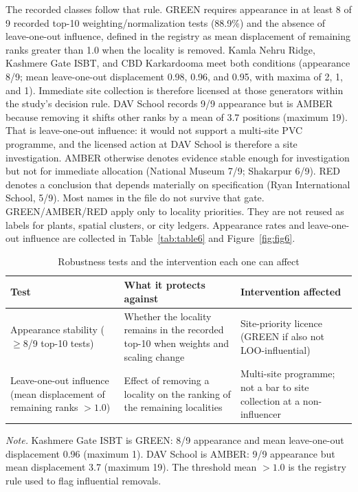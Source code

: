 \documentclass[12pt,a4paper]{article}
\begin{document}
The recorded classes follow that rule. GREEN requires appearance in at least 8 of 9 recorded top-10 weighting/normalization tests (88.9\%) and the absence of leave-one-out influence, defined in the registry as mean displacement of remaining ranks greater than 1.0 when the locality is removed. Kamla Nehru Ridge, Kashmere Gate ISBT, and CBD Karkardooma meet both conditions (appearance 8/9; mean leave-one-out displacement 0.98, 0.96, and 0.95, with maxima of 2, 1, and 1). Immediate site collection is therefore licensed at those generators within the study's decision rule. DAV School records 9/9 appearance but is AMBER because removing it shifts other ranks by a mean of 3.7 positions (maximum 19). That is leave-one-out influence: it would not support a multi-site PVC programme, and the licensed action at DAV School is therefore a site investigation. AMBER otherwise denotes evidence stable enough for investigation but not for immediate allocation (National Museum 7/9; Shakarpur 6/9). RED denotes a conclusion that depends materially on specification (Ryan International School, 5/9). Most names in the file do not survive that gate. GREEN/AMBER/RED apply only to locality priorities. They are not reused as labels for plants, spatial clusters, or city ledgers. Appearance rates and leave-one-out influence are collected in Table~\ref{tab:table6} and Figure~\ref{fig:fig6}.

\begin{table}[htbp]
\centering
\caption{Robustness tests and the intervention each one can affect}
\label{tab:robusttests}
\begin{tabular}{L{3.4cm}L{5.4cm}L{5.0cm}}
\toprule
\textbf{Test} & \textbf{What it protects against} & \textbf{Intervention affected} \\
\midrule
Appearance stability ($\geq$8/9 top-10 tests) & Whether the locality remains in the recorded top-10 when weights and scaling change & Site-priority licence (GREEN if also not LOO-influential) \\
Leave-one-out influence (mean displacement of remaining ranks $>1.0$) & Effect of removing a locality on the ranking of the remaining localities & Multi-site programme; not a bar to site collection at a non-influencer \\
\bottomrule
\end{tabular}
\begin{flushleft}
\footnotesize\textit{Note.} Kashmere Gate ISBT is GREEN: 8/9 appearance and mean leave-one-out displacement 0.96 (maximum 1). DAV School is AMBER: 9/9 appearance but mean displacement 3.7 (maximum 19). The threshold mean $>1.0$ is the registry rule used to flag influential removals.
\end{flushleft}
\end{table}
\end{document}
